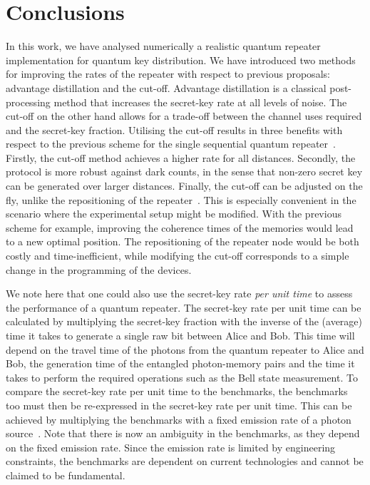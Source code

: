 \documentclass[aps,pra,reprint,superscriptaddress]{revtex4-1}
\begin{document}
\section{Conclusions}
\label{sec:conclusions}
\vspace{-2mm}
In this work, we have analysed numerically a realistic quantum repeater implementation for quantum key distribution. We have introduced two methods for improving the rates of the repeater with respect to previous proposals: advantage distillation and the cut-off.
Advantage distillation is a classical post-processing method that increases the secret-key rate at all levels of noise.
The cut-off on the other hand allows for a trade-off between the channel uses required and the secret-key fraction. Utilising the cut-off results in three benefits with respect to the previous scheme for the single sequential quantum repeater~\cite{luong2015overcoming}. Firstly, the cut-off method achieves a higher rate for all distances. Secondly, the protocol is more robust against dark counts, in the sense that non-zero secret key can be generated over larger distances. Finally, the cut-off can be adjusted on the fly, unlike the repositioning of the repeater~\cite{luong2015overcoming}. This is especially convenient in the scenario where the experimental setup might be modified. With the previous scheme for example, improving the coherence times of the memories would lead to a new optimal position. The repositioning of the repeater node would be both costly and time-inefficient, while modifying the cut-off corresponds to a simple change in the programming of the devices.

We note here that one could also use the secret-key rate \emph{per unit time} to assess the performance of a quantum repeater. The secret-key rate per unit time can be calculated by multiplying the secret-key fraction with the inverse of the (average) time it takes to generate a single raw bit between Alice and Bob. This time will depend on the travel time of the photons from the quantum repeater to Alice and Bob, the generation time of the entangled photon-memory pairs and the time it takes to perform the required operations such as the Bell state measurement. To compare the secret-key rate per unit time to the benchmarks, the benchmarks too must then be re-expressed in the secret-key rate per unit time. This can be achieved by multiplying the benchmarks with a fixed emission rate of a photon source~\cite{piparo2017memory}. Note that there is now an ambiguity in the benchmarks, as they depend on the fixed emission rate. Since the emission rate is limited by engineering constraints, the benchmarks are dependent on current technologies and cannot be claimed to be fundamental.
\end{document}
